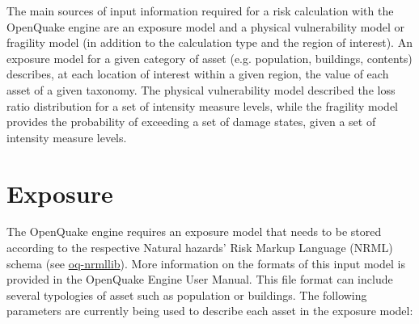 The main sources of input information required for a risk calculation with the OpenQuake engine are an \gls{exposure model} and a physical \gls{vulnerability model} or \gls{fragility model} (in addition to the calculation type and the region of interest). An \gls{exposure model} for a given category of asset (e.g. population, buildings, contents) describes, at each location of interest within a given region, the value of each \gls{asset} of a given \gls{taxonomy}. The physical \gls{vulnerability model} described the loss ratio distribution for a set of intensity measure levels, while the \gls{fragility model} provides the probability of exceeding a set of damage states, given a set of intensity measure levels. %
\section{Exposure}
The OpenQuake engine requires an \gls{exposure model} that needs to be stored according to the respective Natural hazards' Risk Markup Language (NRML) schema (see \href{https://github.com/gem/oq-nrmllib}{oq-nrmllib}). More information on the formats of this input model is provided in the OpenQuake Engine User Manual. This file format can include several typologies of asset such as population or buildings. The following parameters are currently being used to describe each asset in the exposure model: 

